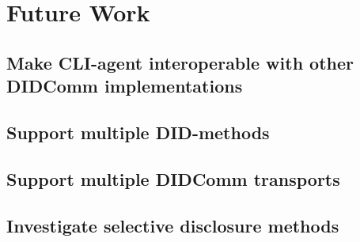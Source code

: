 \chapter{Future Work}

\section{Make CLI-agent interoperable with other DIDComm implementations}

\section{Support multiple DID-methods}

\section{Support multiple DIDComm transports}

\section{Investigate selective disclosure methods}
